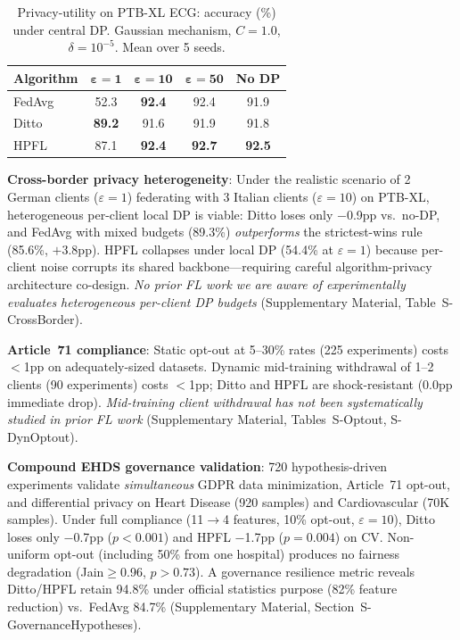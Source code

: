 \documentclass[conference]{IEEEtran}
\begin{document}
\begin{table}[htbp]
\centering
\caption{Privacy-utility on PTB-XL ECG: accuracy (\%) under central DP. Gaussian mechanism, $C{=}1.0$, $\delta{=}10^{-5}$. Mean over 5 seeds.}
\label{tab:dp_mini}
\small
\begin{tabular}{lcccc}
\toprule
\textbf{Algorithm} & $\boldsymbol{\varepsilon{=}1}$ & $\boldsymbol{\varepsilon{=}10}$ & $\boldsymbol{\varepsilon{=}50}$ & \textbf{No DP} \\
\midrule
FedAvg & 52.3 & \textbf{92.4} & 92.4 & 91.9 \\
Ditto & \textbf{89.2} & 91.6 & 91.9 & 91.8 \\
HPFL & 87.1 & \textbf{92.4} & \textbf{92.7} & \textbf{92.5} \\
\bottomrule
\end{tabular}
\end{table}

\textbf{Cross-border privacy heterogeneity}: Under the realistic scenario of 2 German clients ($\varepsilon{=}1$) federating with 3 Italian clients ($\varepsilon{=}10$) on PTB-XL, heterogeneous per-client local DP is viable: Ditto loses only $-$0.9pp vs.\ no-DP, and FedAvg with mixed budgets (89.3\%) \textit{outperforms} the strictest-wins rule (85.6\%, $+$3.8pp). HPFL collapses under local DP (54.4\% at $\varepsilon{=}1$) because per-client noise corrupts its shared backbone---requiring careful algorithm-privacy architecture co-design. \textit{No prior FL work we are aware of experimentally evaluates heterogeneous per-client DP budgets} (Supplementary Material, Table~S-CrossBorder).

\textbf{Article~71 compliance}: Static opt-out at 5--30\% rates (225 experiments) costs $<$1pp on adequately-sized datasets. Dynamic mid-training withdrawal of 1--2 clients (90 experiments) costs $<$1pp; Ditto and HPFL are shock-resistant (0.0pp immediate drop). \textit{Mid-training client withdrawal has not been systematically studied in prior FL work} (Supplementary Material, Tables~S-Optout, S-DynOptout).

\textbf{Compound EHDS governance validation}: 720 hypothesis-driven experiments validate \textit{simultaneous} GDPR data minimization, Article~71 opt-out, and differential privacy on Heart Disease (920 samples) and Cardiovascular (70K samples). Under full compliance (11$\to$4 features, 10\% opt-out, $\varepsilon{=}10$), Ditto loses only $-$0.7pp ($p{<}0.001$) and HPFL $-$1.7pp ($p{=}0.004$) on CV. Non-uniform opt-out (including 50\% from one hospital) produces no fairness degradation (Jain$\geq$0.96, $p{>}0.73$). A governance resilience metric reveals Ditto/HPFL retain 94.8\% under official statistics purpose (82\% feature reduction) vs.\ FedAvg 84.7\% (Supplementary Material, Section~S-GovernanceHypotheses).
\end{document}
